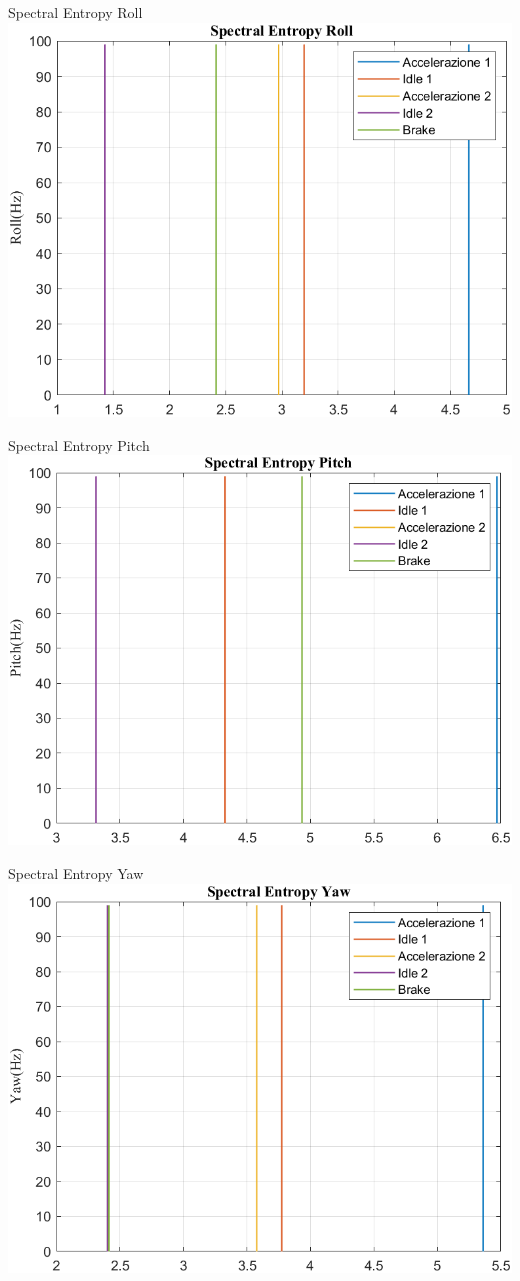 \documentclass[beamer]{standalone}
\begin{document}
	\begin{frame}{{Spectral Entropy Roll}}
		\centering\includegraphics[height=.8\textheight]{figure/VAng/Trasformata/Spectral EntropyRoll}
	\end{frame}
	
	\begin{frame}{{Spectral Entropy Pitch}}
		\centering\includegraphics[height=.8\textheight]{figure/VAng/Trasformata/Spectral EntropyPitch}
	\end{frame}
	
	\begin{frame}{{Spectral Entropy Yaw}}
		\centering\includegraphics[height=.8\textheight]{figure/VAng/Trasformata/Spectral EntropyYaw}
	\end{frame}
		
\end{document}
